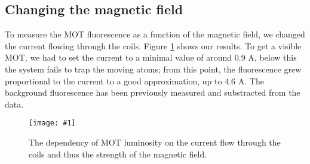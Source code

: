 \documentclass[twocolumn]{article}
\newcommand{\insertFigure}[1]{%
   \texttt{[image: \#1]}%
}
\begin{document}
\subsection{Changing the magnetic field}
To measure the MOT fluorescence as a function of the magnetic field, we changed the current flowing through the coils. Figure \ref{fig:magnetic} shows our results. To get a visible MOT, we had to set the current to a minimal value of around $0.9$ A, below this the system fails to trap the moving atoms; from this point, the fluorescence grew proportional to the current to a good approximation, up to $4.6$ A. The background fluorescence has been previously measured and substracted from the data.
\begin{figure}
\centering
\insertFigure{Images/magnetic_dependence_wo_linear.png}
\caption{The dependency of MOT luminosity on the current flow through the coils and thus the strength of the magnetic field.}
\label{fig:magnetic}
\end{figure}
\end{document}
